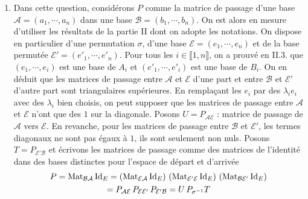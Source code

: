\begin{enumerate}
  \item Dans cette question, considérons $P$ comme la matrice de passage d'une base $\mathcal{A}=(a_1,\cdots,a_n)$ dans une base $\mathcal{B}=(b_1,\cdots,b_n)$.\newline
On est alors en mesure d'utiliser les résultats de la partie II dont on adopte les notations. On dispose en particulier d'une permutation $\sigma$, d'une base $\mathcal{E}=(e_1,\cdots,e_n)$ et de la base permutée $\mathcal{E'}=(e'_1,\cdots,e'_n)$.\newline
Pour tous les $i\in \llbracket 1,n \rrbracket$, on a prouvé en II.3. que $(e_1,\cdots,e_i)$ est une base de $A_i$ et $(e'_1,\cdots,e'_i)$ est une base de $B_i$. On en déduit que les matrices de passage entre $\mathcal{A}$ et $\mathcal{E}$ d'une part et entre $\mathcal{B}$ et $\mathcal{E}'$ d'autre part sont triangulaires supérieures. En remplaçant les $e_i$ par des $\lambda_i e_i$ avec des $\lambda_i$ bien choisis, on peut supposer que les matrices de passage entre $\mathcal{A}$ et $\mathcal{E}$ n'ont que des $1$ sur la diagonale.\newline
Posons $U = P_{\mathcal{A}\mathcal{E}}$ : matrice de passage de $\mathcal{A}$ vers $\mathcal{E}$.\newline
En revanche, pour les matrices de passage entre $\mathcal{B}$ et $\mathcal{E}'$, les termes diagonaux ne sont pas égaux à $1$, ils sont seulement non nuls.\newline
Posons $T = P_{\mathcal{E}'\mathcal{B}}$ et écrivons les matrices de passage comme des matrices de l'identité dans des bases distinctes pour l'espace de départ et d'arrivée
\begin{multline*}
  P = \operatorname{Mat}_{\mathcal{B}\mathcal{A}}\operatorname{Id}_E = 
\left( \operatorname{Mat}_{\mathcal{E}\mathcal{A}}\operatorname{Id}_E\right) \,\left( \operatorname{Mat}_{\mathcal{E}'\mathcal{E}}\operatorname{Id}_E\right) \,\left( \operatorname{Mat}_{\mathcal{B}\mathcal{E}'}\operatorname{Id}_E\right) \\
= P_{\mathcal{A}\mathcal{E}}\,P_{\mathcal{E}\mathcal{E}'}\,P_{\mathcal{E}'\mathcal{B}} = U\,P_{\sigma^{-1}} T \\
 \end{multline*}
\end{enumerate}

